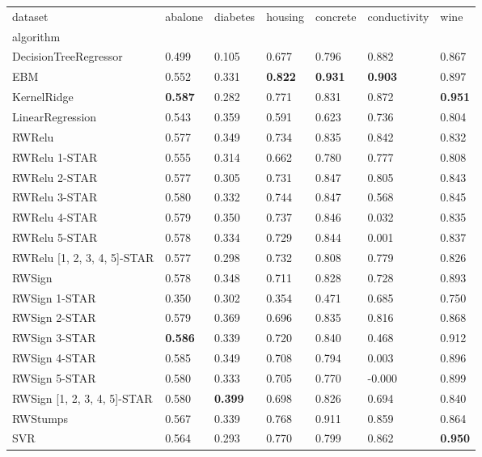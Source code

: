 \begin{tabular}{lllllll}
\toprule
dataset & abalone & diabetes & housing & concrete & conductivity & wine \\
algorithm &  &  &  &  &  &  \\
\midrule
DecisionTreeRegressor & 0.499 & 0.105 & 0.677 & 0.796 & 0.882 & 0.867 \\
EBM & 0.552 & 0.331 & \textbf{0.822} & \textbf{0.931} & \textbf{0.903} & 0.897 \\
KernelRidge & \textbf{0.587} & 0.282 & 0.771 & 0.831 & 0.872 & \textbf{0.951} \\
LinearRegression & 0.543 & 0.359 & 0.591 & 0.623 & 0.736 & 0.804 \\
RWRelu & 0.577 & 0.349 & 0.734 & 0.835 & 0.842 & 0.832 \\
RWRelu 1-STAR & 0.555 & 0.314 & 0.662 & 0.780 & 0.777 & 0.808 \\
RWRelu 2-STAR & 0.577 & 0.305 & 0.731 & 0.847 & 0.805 & 0.843 \\
RWRelu 3-STAR & 0.580 & 0.332 & 0.744 & 0.847 & 0.568 & 0.845 \\
RWRelu 4-STAR & 0.579 & 0.350 & 0.737 & 0.846 & 0.032 & 0.835 \\
RWRelu 5-STAR & 0.578 & 0.334 & 0.729 & 0.844 & 0.001 & 0.837 \\
RWRelu [1, 2, 3, 4, 5]-STAR & 0.577 & 0.298 & 0.732 & 0.808 & 0.779 & 0.826 \\
RWSign & 0.578 & 0.348 & 0.711 & 0.828 & 0.728 & 0.893 \\
RWSign 1-STAR & 0.350 & 0.302 & 0.354 & 0.471 & 0.685 & 0.750 \\
RWSign 2-STAR & 0.579 & 0.369 & 0.696 & 0.835 & 0.816 & 0.868 \\
RWSign 3-STAR & \textbf{0.586} & 0.339 & 0.720 & 0.840 & 0.468 & 0.912 \\
RWSign 4-STAR & 0.585 & 0.349 & 0.708 & 0.794 & 0.003 & 0.896 \\
RWSign 5-STAR & 0.580 & 0.333 & 0.705 & 0.770 & -0.000 & 0.899 \\
RWSign [1, 2, 3, 4, 5]-STAR & 0.580 & \textbf{0.399} & 0.698 & 0.826 & 0.694 & 0.840 \\
RWStumps & 0.567 & 0.339 & 0.768 & 0.911 & 0.859 & 0.864 \\
SVR & 0.564 & 0.293 & 0.770 & 0.799 & 0.862 & \textbf{0.950} \\
\bottomrule
\end{tabular}
